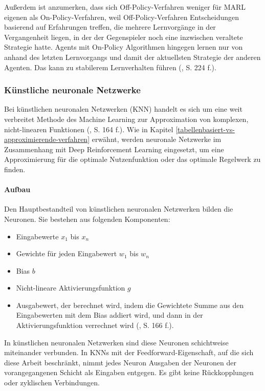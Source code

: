 Außerdem ist anzumerken, dass sich Off-Policy-Verfahren weniger für MARL eigenen als On-Policy-Verfahren, weil Off-Policy-Verfahren Entscheidungen basierend auf Erfahrungen treffen, die mehrere Lernvorgänge in der Vergangenheit liegen, in der der Gegenspieler noch eine inzwischen veraltete Strategie hatte. Agents mit On-Policy Algorithmen hingegen lernen nur von anhand des letzten Lernvorgangs und damit der aktuellsten Strategie der anderen Agenten. Das kann zu stabilerem Lernverhalten führen (\cite{Albrecht.2024}, S. 224 f.).

\subsubsection{Künstliche neuronale Netzwerke}

\label{kuenstliche-neuronale-netzwerke}

Bei künstlichen neuronalen Netzwerken (KNN) handelt es sich um eine weit verbreitet Methode des Machine Learning zur Approximation von komplexen, nicht-linearen Funktionen (\cite{Albrecht.2024}, S. 164 f.). Wie in Kapitel \ref{tabellenbasiert-vs-approximierende-verfahren} erwähnt, werden neuronale Netzwerke im Zusammenhang mit Deep Reinforcement Learning eingesetzt, um eine Approximierung für die optimale Nutzenfunktion oder das optimale Regelwerk zu finden.

\paragraph{Aufbau}

Den Hauptbestandteil von künstlichen neuronalen Netzwerken bilden die Neuronen. Sie bestehen aus folgenden Komponenten:

\begin{itemize}
	\item Eingabewerte $x_1$ bis $x_n$
	\item Gewichte für jeden Eingabewert $w_1$ bis $w_n$
	\item Bias $b$
	\item Nicht-lineare Aktivierungsfunktion $g$
	\item Ausgabewert, der berechnet wird, indem die Gewichtete Summe aus den Eingabewerten mit dem Bias addiert wird, und dann in der Aktivierungsfunktion verrechnet wird (\cite{Albrecht.2024}, S. 166 f.).
\end{itemize}

In künstlichen neuronalen Netzwerken sind diese Neuronen schichtweise miteinander verbunden. In KNNs mit der Feedforward-Eigenschaft, auf die sich diese Arbeit beschränkt, nimmt jedes Neuron Ausgaben der Neuronen der vorangegangenen Schicht als Eingaben entgegen. Es gibt keine Rückkopplungen oder zyklischen Verbindungen.

